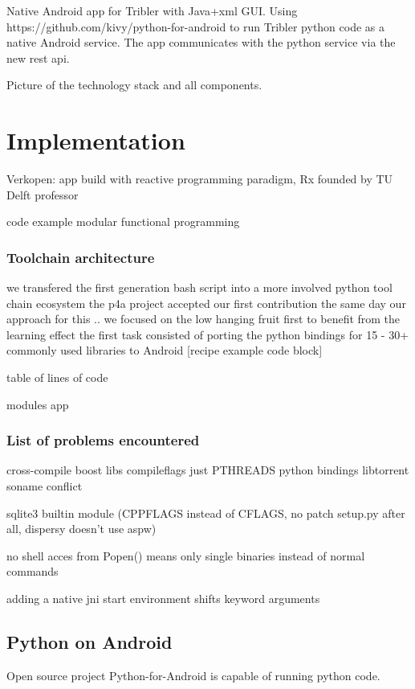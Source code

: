 \documentclass[]{report}
\begin{document}
Native Android app for Tribler with Java+xml GUI.
Using https://github.com/kivy/python-for-android to run Tribler python code as a native Android service.
The app communicates with the python service via the new rest api.

Picture of the technology stack and all components.


\chapter{Implementation}


Verkopen: app build with reactive programming paradigm, Rx founded by TU Delft professor

code example
modular functional programming



\subsection{Toolchain architecture}


we transfered the first generation bash script into a more involved python tool chain ecosystem
the p4a project accepted our first contribution the same day
our approach for this .. we focused on the low hanging fruit first to benefit from the learning effect
the first task consisted of porting the python bindings for 15 - 30+ commonly used libraries to Android [recipe example code block]


table of lines of code

modules app


\subsection*{List of problems encountered}

cross-compile boost libs compileflags just PTHREADS
python bindings libtorrent soname conflict


sqlite3 builtin module (CPPFLAGS instead of CFLAGS, no patch setup.py after all, dispersy doesn't use aspw)


no shell acces from Popen() means only single binaries instead of normal commands

adding a native jni start environment shifts keyword arguments



\section{Python on Android}
Open source project Python-for-Android is capable of running python code.
\end{document}
